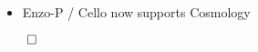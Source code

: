 \NEWSEC

\subsection{\ssRecentSummary}


\begin{frame}[fragile,label=ss-recent-summary] 
\secframetitle{\ssRecentSummary}
\begin{itemize}
\item Enzo-P / Cello now supports Cosmology
\end{itemize}
\vfill
\centerline{$\qed$}
\end{frame}

